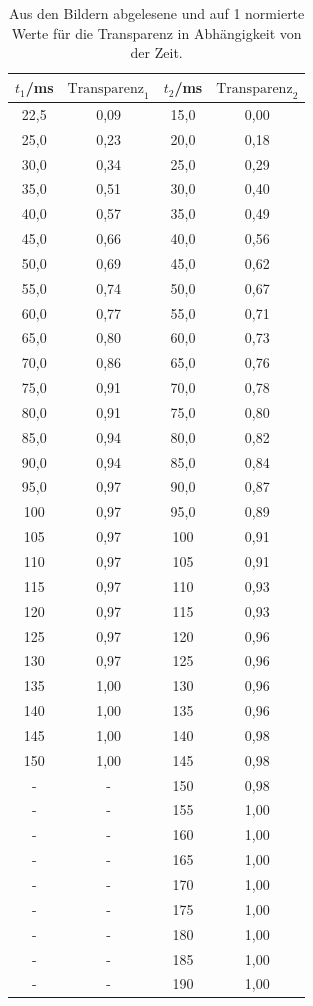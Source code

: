 \begin{equatio*}
\begin{table}[htp]
	\begin{center}
    \caption{Aus den Bildern abgelesene und auf 1 normierte Werte für die Transparenz in Abhängigkeit von der Zeit.}
    \label{tab:flanke}
		\begin{tabular}{cccc}
		\toprule
			{$t_1$/ms} & {$\text{Transparenz}_1$} & {$t_2$/ms} & {$\text{Transparenz}_2$}\\
			\midrule
			22,5 & 0,09 & 15,0 & 0,00\\
			25,0 & 0,23 & 20,0 & 0,18\\
			30,0 & 0,34 & 25,0 & 0,29\\
			35,0 & 0,51 & 30,0 & 0,40\\
			40,0 & 0,57 & 35,0 & 0,49\\
			45,0 & 0,66 & 40,0 & 0,56\\
			50,0 & 0,69 & 45,0 & 0,62\\
			55,0 & 0,74 & 50,0 & 0,67\\
			60,0 & 0,77 & 55,0 & 0,71\\
			65,0 & 0,80 & 60,0 & 0,73\\
			70,0 & 0,86 & 65,0 & 0,76\\
			75,0 & 0,91 & 70,0 & 0,78\\
			80,0 & 0,91 & 75,0 & 0,80\\
			85,0 & 0,94 & 80,0 & 0,82\\
			90,0 & 0,94 & 85,0 & 0,84\\
			95,0 & 0,97 & 90,0 & 0,87\\
			100 & 0,97 & 95,0 & 0,89\\
			105 & 0,97 & 100 & 0,91\\
			110 & 0,97 & 105 & 0,91\\
			115 & 0,97 & 110 & 0,93\\
			120 & 0,97 & 115 & 0,93\\
			125 & 0,97 & 120 & 0,96\\
			130 & 0,97 & 125 & 0,96\\
			135 & 1,00 & 130 & 0,96\\
			140 & 1,00 & 135 & 0,96\\
			145 & 1,00 & 140 & 0,98\\
			150 & 1,00 & 145 & 0,98\\
			- & - & 150 & 0,98\\
			- & - & 155 & 1,00\\
			- & - & 160 & 1,00\\
			- & - & 165 & 1,00\\
			- & - & 170 & 1,00\\
			- & - & 175 & 1,00\\
			- & - & 180 & 1,00\\
			- & - & 185 & 1,00\\
			- & - & 190 & 1,00\\
		\bottomrule
		\end{tabular}
	\end{center}
\end{table}


\end{equatio*}

